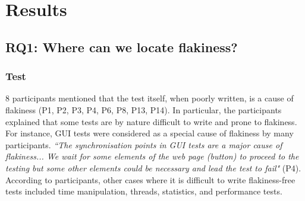 \section{Results}
\label{sec:survey-results}


\subsection{\textsc{RQ1}: Where can we locate flakiness?}
\subsubsection{\textbf{Test}}
8 participants mentioned that the test itself, when poorly written, is a cause of flakiness (P1, P2, P3, P4, P6, P8, P13, P14).
In particular, the participants explained that some tests are by nature difficult to write and prone to flakiness.
For instance, GUI tests were considered as a special cause of flakiness by many participants.
\textit{``The synchronisation points in GUI tests are a major cause of flakiness... We wait for some elements of the web page (\eg button) to proceed to the testing but some other elements could be necessary and lead the test to fail"} (P4).
According to participants, other cases where it is difficult to write flakiness-free tests included time manipulation, threads, statistics, and performance tests.
